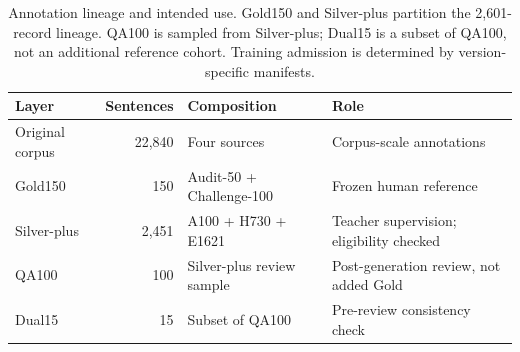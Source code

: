 \begin{table}[htbp]
\caption{Annotation lineage and intended use. Gold150 and Silver-plus partition the 2,601-record lineage. QA100 is sampled from Silver-plus; Dual15 is a subset of QA100, not an additional reference cohort. Training admission is determined by version-specific manifests.}
\label{tab:annotation-lineage}
\centering\small
\begin{tabularx}{\linewidth}{@{}lrlL@{}}
\toprule
Layer & Sentences & Composition & Role \\
\midrule
Original corpus & 22,840 & Four sources & Corpus-scale annotations \\
Gold150 & 150 & Audit-50 + Challenge-100 & Frozen human reference \\
Silver-plus & 2,451 & A100 + H730 + E1621 & Teacher supervision; eligibility checked \\
QA100 & 100 & Silver-plus review sample & Post-generation review, not added Gold \\
Dual15 & 15 & Subset of QA100 & Pre-review consistency check \\
\bottomrule
\end{tabularx}
\end{table}
